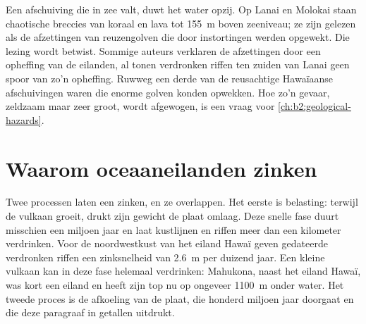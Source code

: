 \begin{omfigure}
\par{}
\end{omfigure}

Een afschuiving die in zee valt, duwt het water opzij. Op Lanai en Molokai staan chaotische breccies
van koraal en lava tot \qty{155}{m} boven zeeniveau; ze zijn gelezen als de afzettingen van
reuzengolven die door instortingen werden opgewekt. Die lezing wordt betwist. Sommige auteurs verklaren de afzettingen door een
opheffing van de eilanden, al tonen verdronken riffen ten zuiden van Lanai geen spoor van zo'n opheffing.
Ruwweg een derde van de reusachtige Hawaïaanse afschuivingen waren  die enorme golven konden opwekken. Hoe
zo'n gevaar, zeldzaam maar zeer groot, wordt afgewogen, is een vraag voor \cref{ch:b2:geological-hazards}.

\section{Waarom oceaaneilanden zinken}\label{sec:b2:oceanic-islands:subsidence}

Twee processen laten een  zinken, en ze overlappen. Het eerste is belasting: terwijl de vulkaan
groeit, drukt zijn gewicht de plaat omlaag. Deze snelle fase duurt misschien een miljoen jaar en
laat kustlijnen en riffen meer dan een kilometer verdrinken. Voor de noordwestkust van het eiland
Hawaï geven gedateerde verdronken riffen een zinksnelheid van \qty{2.6}{m} per duizend jaar. Een kleine
vulkaan kan in deze fase helemaal verdrinken: Mahukona, naast het eiland Hawaï, was kort een
eiland en heeft zijn top nu op ongeveer \qty{1100}{m} onder water. Het tweede proces is de
afkoeling van de plaat, die honderd miljoen jaar doorgaat en die deze paragraaf in
getallen uitdrukt.

